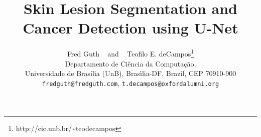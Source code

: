 \documentclass{article}
\title{Skin Lesion Segmentation and Cancer Detection using U-Net}
\author{
  Fred Guth ~ and ~ Teofilo E. deCampos\thanks{http://cic.unb.br/\~{}teodecampos}\\
  Departamento de Ciência da Computação,\\
  Universidade de Brasília (UnB), Bras\'{\i}lia-DF, Brazil, CEP 70910-900 \\
  \texttt{fredguth@fredguth.com}, \texttt{t.decampos@oxfordalumni.org}
  
}
\begin{document}

\maketitle

\begin{abstract}
  
\end{abstract}



\medskip

\small




\end{document}
